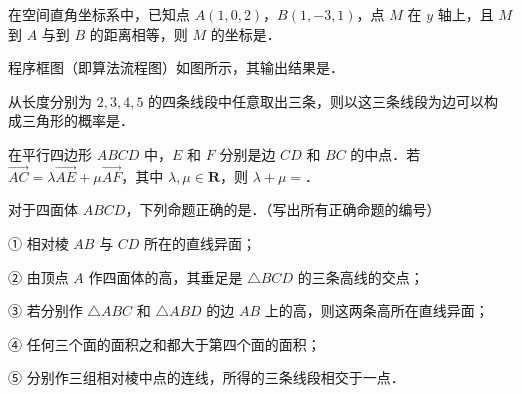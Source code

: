 \begin{question}
在空间直角坐标系中，已知点 $A(1,0,2)$，$B(1,-3,1)$，点 $M$ 在 $y$ 轴上，且 $M$ 到 $A$ 与到 $B$ 的距离相等，则 $M$ 的坐标是\gkblank{}．

\Needspace{0.4\textheight}
\end{question}
\begin{question}
程序框图（即算法流程图）如图所示，其输出结果是\gkblank{}．
\nopagebreak[4]
\begin{center}\end{center}
\nopagebreak[4]
\end{question}
\begin{question}
从长度分别为 $2,3,4,5$ 的四条线段中任意取出三条，则以这三条线段为边可以构成三角形的概率是\gkblank{}．

\end{question}
\begin{question}
在平行四边形 $ABCD$ 中，$E$ 和 $F$ 分别是边 $CD$ 和 $BC$ 的中点．若 $\overrightarrow{AC}=\lambda\overrightarrow{AE}+\mu\overrightarrow{AF}$，其中 $\lambda,\mu\in\mathbf R$，则 $\lambda+\mu=$\gkblank{}．

\end{question}
\begin{question}
对于四面体 $ABCD$，下列命题正确的是\gkblank{}．（写出所有正确命题的编号）

① 相对棱 $AB$ 与 $CD$ 所在的直线异面；

② 由顶点 $A$ 作四面体的高，其垂足是 $\triangle BCD$ 的三条高线的交点；

③ 若分别作 $\triangle ABC$ 和 $\triangle ABD$ 的边 $AB$ 上的高，则这两条高所在直线异面；

④ 任何三个面的面积之和都大于第四个面的面积；

⑤ 分别作三组相对棱中点的连线，所得的三条线段相交于一点．

\end{question}

